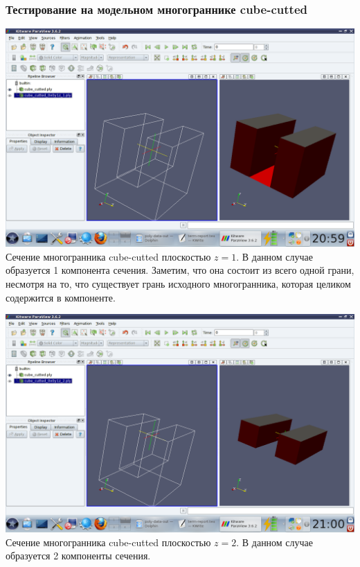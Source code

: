 \documentclass[a4paper,12pt, titlepage]{article}
\begin{document}
\subsubsection{Тестирование на модельном многограннике cube-cutted}
	\begin{flushleft}
		\includegraphics[trim = 220 65 10 140, clip, width=15cm]{cube-cutted/1.png}
		Сечение многогранника cube-cutted плоскостью $z = 1$. В данном случае образуется 1
		компонента сечения. Заметим, что она состоит из всего одной грани, несмотря на то, что
		существует грань исходного многогранника, которая целиком содержится в компоненте.
	\end{flushleft}
	\begin{flushleft}
		\includegraphics[trim = 220 65 10 140, clip, width=15cm]{cube-cutted/2.png}
		Сечение многогранника cube-cutted плоскостью $z = 2$. В данном случае образуется 2
		компоненты сечения.
	\end{flushleft}
\end{document}
